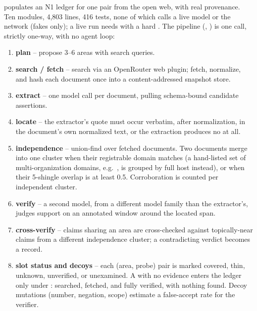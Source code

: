  populates an N1 ledger for one  pair from the open web,
with real provenance. Ten modules, 4{,}803 lines, 416 tests, none of which calls a live model or
the network (fakes only); a live run needs  with a hard
. The pipeline (,
) is one  call,
strictly one-way, with no agent loop:

\begin{enumerate}[noitemsep]
  \item \textbf{plan} -- propose 3--6 areas with search queries.
  \item \textbf{search / fetch} -- search via an OpenRouter web plugin; fetch, normalize, and hash
    each document once into a content-addressed snapshot store.
  \item \textbf{extract} -- one model call per document, pulling schema-bound candidate assertions.
  \item \textbf{locate} -- the extractor's quote must occur verbatim, after normalization, in the
    document's own normalized text, or the extraction produces no  at all.
  \item \textbf{independence} -- union-find over fetched documents. Two documents merge into one
    cluster when their registrable domain matches (a hand-listed set of multi-organization
    domains, e.g.\ , is grouped by full host instead), or when their 5-shingle
    overlap is at least 0.5. Corroboration is counted per independent cluster.
  \item \textbf{verify} -- a second model, from a different model family than the extractor's,
    judges support on an annotated window around the located span.
  \item \textbf{cross-verify} -- claims sharing an area are cross-checked against topically-near
    claims from a different independence cluster; a contradicting verdict becomes a
     record.
  \item \textbf{slot status and decoys} -- each (area, probe) pair is marked covered, thin,
    unknown, unverified, or unexamined. A  with no evidence enters the ledger
    only under : searched, fetched, and fully verified, with nothing found. Decoy
    mutations (number, negation, scope) estimate a false-accept rate for the verifier.
\end{enumerate}

